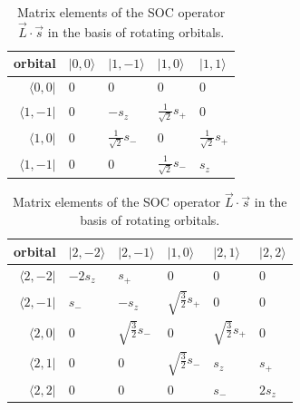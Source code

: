 \begin{table}[h!]
\begin{tabularx}{\textwidth}{|r| X X X X|}
\hline
orbital & $|0, 0 \rangle$ & $|1, -1 \rangle$ & $|1, 0 \rangle$ & $|1, 1 \rangle$ \\ \hline
$\langle 0, 0|$ & 0 & 0 & 0 & 0 \\
$\langle 1, -1|$ & 0 & $-s_z$ & $\frac{1}{\sqrt{2}} s_{+} $ & 0 \\
$\langle 1, 0|$ & 0 & $\frac{1}{\sqrt{2}} s_{-} $ & 0 & $\frac{1}{\sqrt{2}} s_{+} $ \\
$\langle 1, -1|$ & 0 & 0 & $\frac{1}{\sqrt{2}} s_{-} $ & $s_z$ \\ \hline
\end{tabularx}
\newline
\vspace*{0.5 cm}
\newline
\begin{tabularx}{\textwidth}{|r| X X X X X|}
\hline
orbital & $|2, -2 \rangle$ & $|2, -1 \rangle$ & $|1, 0 \rangle$ & $|2, 1 \rangle$ & $|2, 2 \rangle $ \\ \hline
$\langle 2, -2|$ & $-2 s_z$ & $s_{+} $ & 0 & 0 & 0\\
$\langle 2, -1|$ & $s_{-}$ & $-s_z$ & $\sqrt{\frac{3}{2}} s_{+} $ & 0 & 0\\
$\langle 2, 0|$ & 0 & $\sqrt{\frac{3}{2}} s_{-} $ & 0 & $\sqrt{\frac{3}{2}} s_{+} $ & 0\\
$\langle 2, 1|$ & 0 & 0 & $\sqrt{\frac{3}{2}} s_{-} $ & $s_z$ & $s_{+} $\\
$\langle 2, 2|$ & 0 & 0 & 0 & $s_{-} $ & $2 s_z $\\
\hline
\end{tabularx}
\caption{Matrix elements of the SOC operator $\vec{L} \cdot \vec{s}$ in the basis of rotating orbitals.}
\label{tab:soc1}
\end{table}

